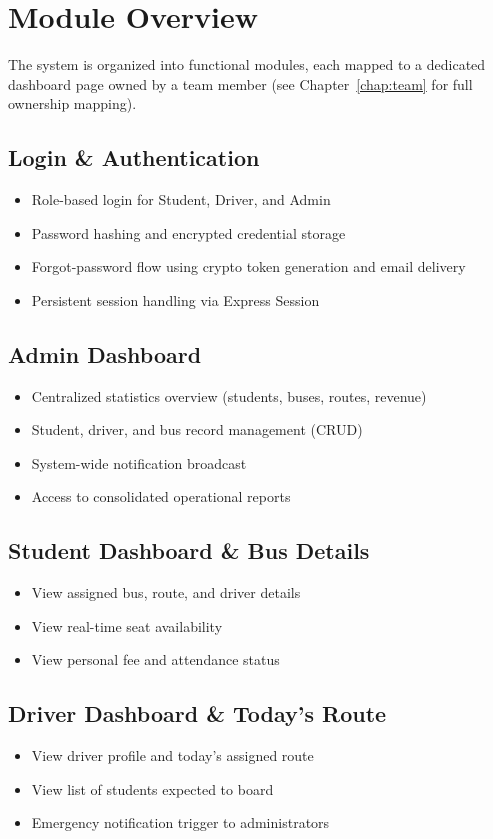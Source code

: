 \documentclass[11pt,a4paper]{report}
\begin{document}
\section{Module Overview}
The system is organized into functional modules, each mapped to a dedicated dashboard page owned by a team member (see Chapter~\ref{chap:team} for full ownership mapping).

\subsection{Login \& Authentication}
\begin{itemize}[leftmargin=1.3em]
  \item Role-based login for Student, Driver, and Admin
  \item Password hashing and encrypted credential storage
  \item Forgot-password flow using crypto token generation and email delivery
  \item Persistent session handling via Express Session
\end{itemize}

\subsection{Admin Dashboard}
\begin{itemize}[leftmargin=1.3em]
  \item Centralized statistics overview (students, buses, routes, revenue)
  \item Student, driver, and bus record management (CRUD)
  \item System-wide notification broadcast
  \item Access to consolidated operational reports
\end{itemize}

\subsection{Student Dashboard \& Bus Details}
\begin{itemize}[leftmargin=1.3em]
  \item View assigned bus, route, and driver details
  \item View real-time seat availability
  \item View personal fee and attendance status
\end{itemize}

\subsection{Driver Dashboard \& Today's Route}
\begin{itemize}[leftmargin=1.3em]
  \item View driver profile and today's assigned route
  \item View list of students expected to board
  \item Emergency notification trigger to administrators
\end{itemize}
\end{document}

